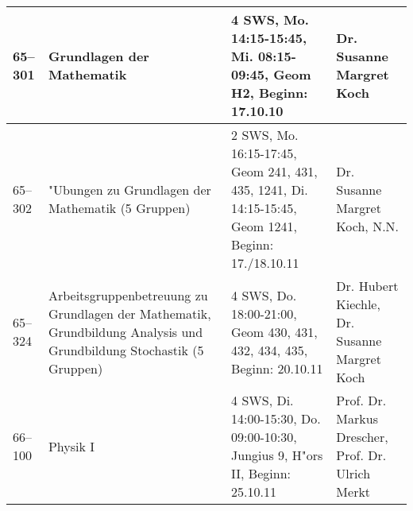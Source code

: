 \begin{tabularx}{\textwidth}{|l|X|X|X|}
\hline 65--301 	& Grundlagen der Mathematik
								& 4 SWS, Mo. 14:15-15:45, Mi. 08:15-09:45, Geom H2, Beginn: 17.10.10
								& Dr. Susanne Margret Koch \\
\hline 65--302 & "Ubungen zu Grundlagen der Mathematik (5 Gruppen)
               & 2 SWS, Mo. 16:15-17:45, Geom 241, 431, 435, 1241, Di. 14:15-15:45, Geom 1241, Beginn: 17./18.10.11
               & Dr. Susanne Margret Koch, N.N. \\
\hline 65--324 & Arbeitsgruppenbetreuung zu Grundlagen der Mathematik, Grundbildung Analysis und Grundbildung Stochastik (5 Gruppen)
               & 4 SWS, Do. 18:00-21:00, Geom 430, 431, 432, 434, 435, Beginn: 20.10.11
               & Dr. Hubert Kiechle, Dr. Susanne Margret Koch \\
%	                          
	               
%
\hline 66--100 	& Physik I
                & 4 SWS, Di. 14:00-15:30, Do. 09:00-10:30, Jungius 9, H"ors II, Beginn: 25.10.11
                & Prof. Dr. Markus Drescher, Prof. Dr. Ulrich Merkt \\
                

\end{tabularx}
